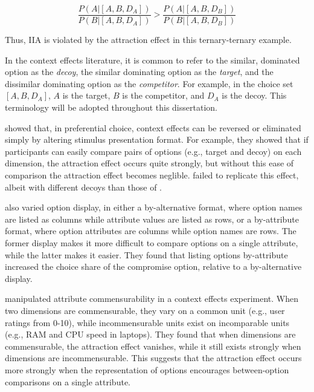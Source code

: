 \begin{equation}
  \frac{P(A|[A,B,D_{A}])}{P(B|[A,B,D_{A}])}>\frac{P(A|[A,B,D_{B}])}{P(B|[A,B,D_{B}])}
  \label{eqn:iia_att2}
\end{equation}

Thus, IIA is violated by the attraction effect in this ternary-ternary example.

In the context effects literature, it is common to refer to the similar, dominated option as the \textit{decoy}, the similar dominating option as the \textit{target}, and the dissimilar dominating option as the \textit{competitor}. For example, in the choice set $[A,B,D_{A}]$, $A$ is the target, $B$ is the competitor, and $D_{A}$ is the decoy. This terminology will be adopted throughout this dissertation.

\textcite{cataldoComparisonProcessAccount2019b} showed that, in preferential choice, context effects can be reversed or eliminated simply by altering stimulus presentation format. For example, they showed that if participants can easily compare pairs of options (e.g., target and decoy) on each dimension, the attraction effect occurs quite strongly, but without this ease of comparison the attraction effect becomes neglible. \textcite{hasan2025registered} failed to replicate this effect, albeit with different decoys than those of \textcite{cataldoComparisonProcessAccount2019b}. 

\textcite{changWhichCompromiseOption2008} also varied option display, in either a by-alternative format, where option names are listed as columns while attribute values are listed as rows, or a by-attribute format, where option attributes are columns while option names are rows. The former display makes it more difficult to compare options on a single attribute, while the latter makes it easier. They found that listing options by-attribute increased the choice share of the compromise option, relative to a by-alternative display. 

\textcite{hayes2024attribute} manipulated attribute commensurability in a context effects experiment. When two dimensions are commensurable, they vary on a common unit (e.g., user ratings from 0-10), while incommensurable units exist on incomparable units (e.g., RAM and CPU speed in laptops). They found that when dimensions are commensurable, the attraction effect vanishes, while it still exists strongly when dimensions are incommensurable. This suggests that the attraction effect occurs more strongly when the representation of options encourages between-option comparisons on a single attribute.

